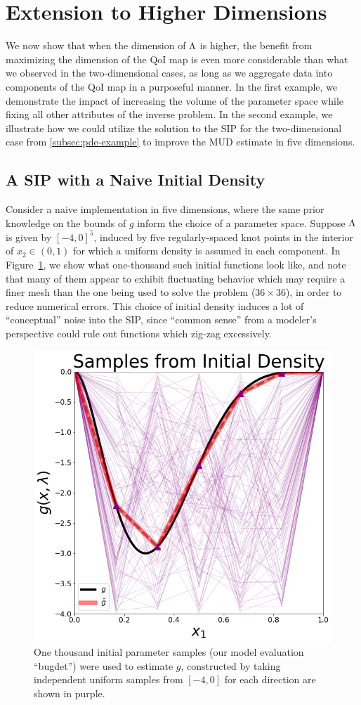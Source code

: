 \section{Extension to Higher Dimensions}\label{sec:mud-higher-dimensions}
We now show that when the dimension of ${\Lambda}$ is higher, the benefit from maximizing the dimension of the QoI map is even more considerable than what we observed in the two-dimensional cases, as long as we aggregate data into components of the QoI map in a purposeful manner.
In the first example, we demonstrate the impact of increasing the volume of the parameter space while fixing all other attributes of the inverse problem.
In the second example, we illustrate how we could utilize the solution to the SIP for the two-dimensional case from \ref{subsec:pde-example} to improve the MUD estimate in five dimensions.

\subsection{A SIP with a Naive Initial Density}
Consider a naive implementation in five dimensions, where the same prior knowledge on the bounds of $g$ inform the choice of a parameter space.
Suppose ${\Lambda}$ is given by $[-4, 0]^5$, induced by five regularly-spaced knot points in the interior of $x_2 \in (0,1)$ for which a uniform density is assumed in each component.
In Figure~\ref{fig:pde-highd-initial-5d}, we show what one-thousand such initial functions look like, and note that many of them appear to exhibit fluctuating behavior which may require a finer mesh than the one being used to solve the problem ($36\times36$), in order to reduce numerical errors.
This choice of initial density induces a lot of ``conceptual'' noise into the SIP, since ``common sense'' from a modeler's perspective could rule out functions which zig-zag excessively.

\begin{figure}
\centering
  \includegraphics[width=0.475\linewidth]{figures/pde-highd/pde-highd_init_D5.png}
\caption{
One thousand initial parameter samples (our model evaluation ``bugdet'') were used to estimate $g$, constructed by taking independent uniform samples from $[-4, 0]$ for each direction are shown in purple.
}
\label{fig:pde-highd-initial-5d}
\end{figure}



